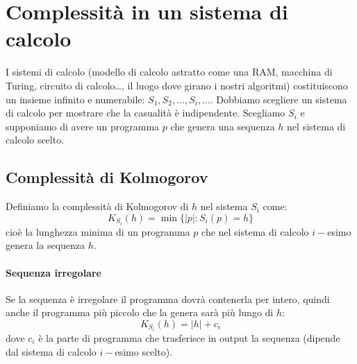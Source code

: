\section{Complessità in un sistema di calcolo}
I sistemi di calcolo (modello di calcolo astratto come una RAM, macchina di Turing, circuito di calcolo…, il luogo dove girano i nostri algoritmi) costituiscono un insieme infinito e numerabile: $S_1,S_2,\dots,S_i,\dots$. Dobbiamo scegliere un sistema di calcolo per mostrare che la casualità è indipendente. Scegliamo $S_i$ e supponiamo di avere un programma $p$ che genera una sequenza $h$ nel sistema di calcolo scelto. 
\subsection{Complessità di Kolmogorov} 
Definiamo la complessità di Kolmogorov di $h$ nel sistema $S_i$ come: 
$$
    K_{S_i}(h) = \min\{ |p| : S_i(p) = h \}
$$
cioè la lunghezza minima di un programma $p$ che nel sistema di calcolo $i-$esimo genera la sequenza $h$. \paragraph{Sequenza irregolare} Se la sequenza è irregolare il programma dovrà contenerla per intero, quindi anche il programma più piccolo che la genera sarà più lungo di $h$:
$$
    K_{S_i}(h) = |h| + c_i
$$
dove $c_i$ è la parte di programma che trasferisce in output la sequenza (dipende dal sistema di calcolo $i-$esimo scelto).

